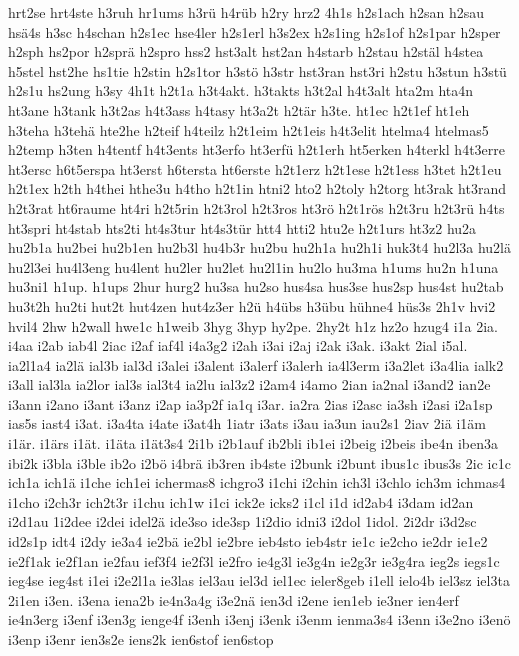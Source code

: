 {hrt2se
hrt4ste
h3ruh
hr1ums
h3rü
h4rüb
h2ry
hrz2
4h1s
h2s1ach
h2san
h2sau
hsä4s
h3sc
h4schan
h2s1ec
hse4ler
h2s1erl
h3s2ex
h2s1ing
h2s1of
h2s1par
h2sper
h2sph
hs2por
h2sprä
h2spro
hss2
hst3alt
hst2an
h4starb
h2stau
h2stäl
h4stea
h5stel
hst2he
hs1tie
h2stin
h2s1tor
h3stö
h3str
hst3ran
hst3ri
h2stu
h3stun
h3stü
h2s1u
hs2ung
h3sy
4h1t
h2t1a
h3t4akt.
h3takts
h3t2al
h4t3alt
hta2m
hta4n
ht3ane
h3tank
h3t2as
h4t3ass
h4tasy
ht3a2t
h2tär
h3te.
ht1ec
h2t1ef
ht1eh
h3teha
h3tehä
hte2he
h2teif
h4teilz
h2t1eim
h2t1eis
h4t3elit
htelma4
htelmas5
h2temp
h3ten
h4tentf
h4t3ents
ht3erfo
ht3erfü
h2t1erh
ht5erken
h4terkl
h4t3erre
ht3ersc
h6t5erspa
ht3erst
h6tersta
ht6erste
h2t1erz
h2t1ese
h2t1ess
h3tet
h2t1eu
h2t1ex
h2th
h4thei
hthe3u
h4tho
h2t1in
htni2
hto2
h2toly
h2torg
ht3rak
ht3rand
h2t3rat
ht6raume
ht4ri
h2t5rin
h2t3rol
h2t3ros
ht3rö
h2t1rös
h2t3ru
h2t3rü
h4ts
ht3spri
ht4stab
hts2ti
ht4s3tur
ht4s3tür
htt4
htti2
htu2e
h2t1urs
ht3z2
hu2a
hu2b1a
hu2bei
hu2b1en
hu2b3l
hu4b3r
hu2bu
hu2h1a
hu2h1i
huk3t4
hu2l3a
hu2lä
hu2l3ei
hu4l3eng
hu4lent
hu2ler
hu2let
hu2l1in
hu2lo
hu3ma
h1ums
hu2n
h1una
hu3ni1
h1up.
h1ups
2hur
hurg2
hu3sa
hu2so
hus4sa
hus3se
hus2sp
hus4st
hu2tab
hu3t2h
hu2ti
hut2t
hut4zen
hut4z3er
h2ü
h4übs
h3übu
hühne4
hüs3s
2h1v
hvi2
hvil4
2hw
h2wall
hwe1c
h1weib
3hyg
3hyp
hy2pe.
2hy2t
h1z
hz2o
hzug4
i1a
2ia.
i4aa
i2ab
iab4l
2iac
i2af
iaf4l
i4a3g2
i2ah
i3ai
i2aj
i2ak
i3ak.
i3akt
2ial
i5al.
ia2l1a4
ia2lä
ial3b
ial3d
i3alei
i3alent
i3alerf
i3alerh
ia4l3erm
i3a2let
i3a4lia
ialk2
i3all
ial3la
ia2lor
ial3s
ial3t4
ia2lu
ial3z2
i2am4
i4amo
2ian
ia2nal
i3and2
ian2e
i3ann
i2ano
i3ant
i3anz
i2ap
ia3p2f
ia1q
i3ar.
ia2ra
2ias
i2asc
ia3sh
i2asi
i2a1sp
ias5s
iast4
i3at.
i3a4ta
i4ate
i3at4h
1iatr
i3ats
i3au
ia3un
iau2s1
2iav
2iä
i1äm
i1är.
i1ärs
i1ät.
i1äta
i1ät3s4
2i1b
i2b1auf
ib2bli
ib1ei
i2beig
i2beis
ibe4n
iben3a
ibi2k
i3bla
i3ble
ib2o
i2bö
i4brä
ib3ren
ib4ste
i2bunk
i2bunt
ibus1c
ibus3s
2ic
ic1c
ich1a
ich1ä
i1che
ich1ei
ichermas8
ichgro3
i1chi
i2chin
ich3l
i3chlo
ich3m
ichmas4
i1cho
i2ch3r
ich2t3r
i1chu
ich1w
i1ci
ick2e
icks2
i1cl
i1d
id2ab4
i3dam
id2an
i2d1au
1i2dee
i2dei
idel2ä
ide3so
ide3sp
1i2dio
idni3
i2dol
1idol.
2i2dr
i3d2sc
id2s1p
idt4
i2dy
ie3a4
ie2bä
ie2bl
ie2bre
ieb4sto
ieb4str
ie1c
ie2cho
ie2dr
ie1e2
ie2f1ak
ie2f1an
ie2fau
ief3f4
ie2f3l
ie2fro
ie4g3l
ie3g4n
ie2g3r
ie3g4ra
ieg2s
iegs1c
ieg4se
ieg4st
i1ei
i2e2l1a
ie3las
iel3au
iel3d
iel1ec
ieler8geb
i1ell
ielo4b
iel3sz
iel3ta
2i1en
i3en.
i3ena
iena2b
ie4n3a4g
i3e2nä
ien3d
i2ene
ien1eb
ie3ner
ien4erf
ie4n3erg
i3enf
i3en3g
ienge4f
i3enh
i3enj
i3enk
i3enm
ienma3s4
i3enn
i3e2no
i3enö
i3enp
i3enr
ien3s2e
iens2k
ien6stof
ien6stop
}
